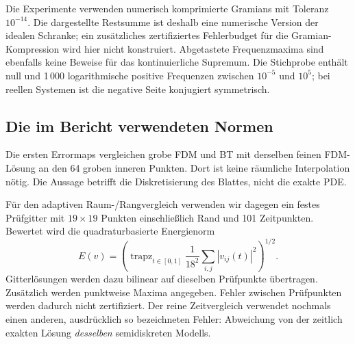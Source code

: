Die Experimente verwenden numerisch komprimierte Gramians mit Toleranz $10^{-14}$. Die dargestellte Restsumme ist deshalb eine numerische Version der idealen Schranke; ein zusätzliches zertifiziertes Fehlerbudget für die Gramian-Kompression wird hier nicht konstruiert. Abgetastete Frequenzmaxima sind ebenfalls keine Beweise für das kontinuierliche Supremum. Die Stichprobe enthält null und 1\,000 logarithmische positive Frequenzen zwischen $10^{-5}$ und $10^5$; bei reellen Systemen ist die negative Seite konjugiert symmetrisch.

\subsection{Die im Bericht verwendeten Normen}
Die ersten Errormaps vergleichen grobe FDM und BT mit derselben feinen FDM-Lösung an den 64 groben inneren Punkten. Dort ist keine räumliche Interpolation nötig. Die Aussage betrifft die Diskretisierung des Blattes, nicht die exakte PDE.

Für den adaptiven Raum-/Rangvergleich verwenden wir dagegen ein festes Prüfgitter mit $19\times19$ Punkten einschließlich Rand und 101 Zeitpunkten. Bewertet wird die quadraturbasierte Energienorm
\begin{equation}\label{eq:energy}
 E(v)=\left(\operatorname{trapz}_{t\in[0,1]}\frac1{18^2}\sum_{i,j}|v_{ij}(t)|^2\right)^{1/2}.
\end{equation}
Gitterlösungen werden dazu bilinear auf dieselben Prüfpunkte übertragen. Zusätzlich werden punktweise Maxima angegeben. Fehler zwischen Prüfpunkten werden dadurch nicht zertifiziert. Der reine Zeitvergleich verwendet nochmals einen anderen, ausdrücklich so bezeichneten Fehler: Abweichung von der zeitlich exakten Lösung \emph{desselben} semidiskreten Modells.
